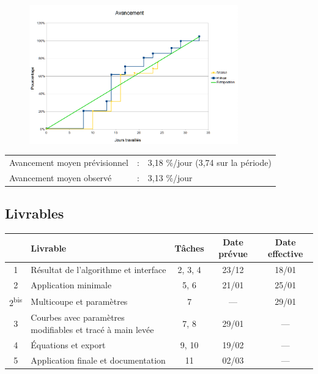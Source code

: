 \documentclass[xcolor=dvipsnames]{beamer}
\begin{document}
	\begin{frame}{\subsecname}
		\begin{figure}
			\includegraphics[height=6cm]{Images/Avancement2.png}
		\end{figure}
		\begin{tabular}{ll}
		Avancement moyen pr\'evisionnel& : \,\,\,\,3,18 \%/jour (3,74 sur la p\'eriode)\\
		Avancement moyen observ\'e & : \,\,\,\,3,13 \%/jour
		\end{tabular}
	\end{frame}


	\subsection{Livrables}
	\begin{frame}{\subsecname}
		\begin{center}
		\small
		\begin{tabular}{|c|>{\raggedright}m{3cm}|c|c|c|}
			\hline
			\textbf{\No} & \textbf{Livrable} & \textbf{T\^aches}
			& \textbf{Date pr\'evue} & \textbf{Date effective}\\
			\hline
			1 & R\'esultat de l'algorithme et interface & 2, 3, 4 & 23/12 
			& 18/01\\
			\hline
			2 & Application minimale & 5, 6 & 21/01 & 25/01\\
			\hline
			2\textsuperscript{bis} & Multicoupe et param\`etres & 7 & --- & 29/01\\
			\hline
			3 & Courbes avec param\`etres modifiables et trac\'e \`a main
			lev\'ee& 7, 8 & 29/01 & ---\\
			\hline
			4 & \'Equations et export & 9, 10 & 19/02 & ---\\
			\hline
			5 & Application finale et documentation & 11 & 02/03 & ---\\
			\hline
		\end{tabular}
		\end{center}
	\end{frame}
\end{document}
